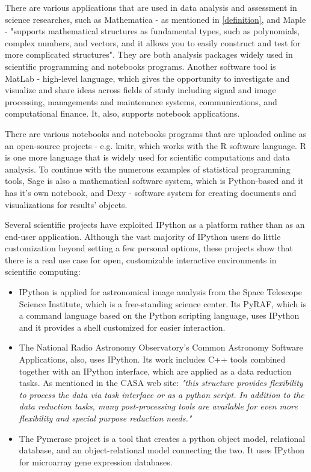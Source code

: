 There are various applications that are used in data analysis and assessment in science researches, such as Mathematica - as mentioned in \ref{definition}, and Maple - "supports mathematical structures as fundamental types, such as polynomials, complex numbers, and vectors, and it allows you to easily construct and test for more complicated structures".\cite{mathematicaWiki} \cite{maple} They are both analysis packages widely used in scientific programming and notebooks programs. Another software tool is MatLab - high-level language, which gives the opportunity to investigate and visualize and share ideas across fields of study including signal and image processing, managements and maintenance systems, communications, and computational finance.\cite{matLab} It, also, supports notebook applications.

There are various notebooks and notebooks programs that are uploaded online as an open-source projects - e.g. knitr, which works with the R software language. R is one more language that is widely used for scientific computations and data analysis.\cite{knitr} To continue with the numerous examples of statistical programming tools, Sage is also a mathematical software system, which is Python-based and it has it's own notebook, and Dexy - software system for creating documents and visualizations for results' objects.\cite{sage}\cite{dexy}\cite{shen2014interactive} 

Several scientific projects have exploited IPython as a platform
rather than as an end-user application. Although
the vast majority of IPython users do little customization beyond
setting a few personal options, these projects show
that there is a real use case for open, customizable interactive
environments in scientific computing:\cite{perez2007ipython}

\begin{itemize}
\item IPython is applied for astronomical image analysis from the Space Telescope Science Institute, which is a free-standing science center. Its PyRAF, which is a command language based on the Python scripting language, uses IPython and it provides a shell customized for easier interaction. \cite{pyRaf}

\item The National Radio Astronomy Observatory’s Common Astronomy Software Applications, also, uses IPython. Its work includes C++ tools combined together with an IPython interface, which are applied as a data reduction tasks.\cite{casa} As mentioned in the CASA web site: \textit{"this structure provides flexibility to process the data via task interface or as a python script. In addition to the data reduction tasks, many post-processing tools are available for even more flexibility and special purpose reduction needs."}\cite{casa}

\item The Pymerase project is a tool that creates a python object model, relational database, and an object-relational model connecting the two. It uses IPython for microarray gene expression databases.\cite{pymerase}

\end{itemize}

